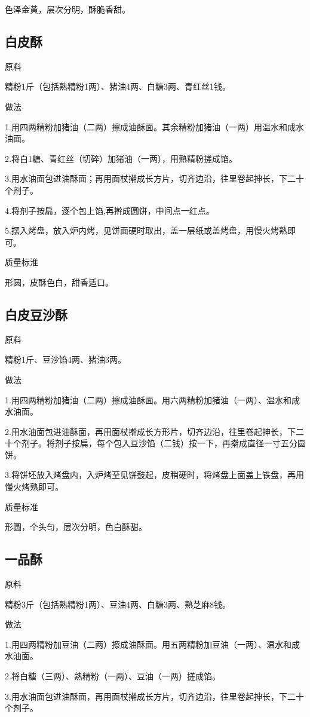 \documentclass{ctexbook}
\begin{document}
色泽金黄，层次分明，酥脆香甜。
\subsection{白皮酥}
原料

精粉1斤（包括熟精粉1两）、猪油4两、白糖3两、青红丝1钱。

做法

1.用四两精粉加猪油（二两）擦成油酥面。其余精粉加猪油（一两）用温水和成水油面。

2.将白1糖、青红丝（切碎）加猪油（一两），用熟精粉搓成馅。

3.用水油面包进油酥面；再用面杖擀成长方片，切齐边沿，往里卷起抻长，下二十个剂子。

4.将剂子按扁，逐个包上馅,再擀成圆饼，中间点一红点。

5.摆入烤盘，放入炉内烤，见饼面硬时取出，盖一层纸或盖烤盘，用慢火烤熟即可。

质量标淮

形圆，皮酥色白，甜香适口。
\subsection{白皮豆沙酥}
原料

精粉1斤、豆沙馅4两、猪油3两。

做法

1.用四两精粉加猪油（二两）擦成油酥面。用六两精粉加猪油（一两）、温水和成水油面。

2.用水油面包进油酥面，再用面杖擀成长方形片，切齐边沿，往里卷起抻长，下二十个剂子。将剂子按扁，每个包入豆沙馅（二钱）按一下，再擀成直径一寸五分圆饼。

3.将饼坯放入烤盘内，入炉烤至见饼鼓起，皮稍硬时，将烤盘上面盖上铁盘，再用慢火烤熟即可。

质量标准

形圆，个头匀，层次分明，色白酥甜。
\subsection{一品酥}
原料

精粉3斤（包括熟精粉1两）、豆油4两、白糖3两、熟芝麻8钱。

做法

1.用四两精粉加豆油（二两）擦成油酥面。用五两精粉加豆油（一两）、温水和成水油面。

2.将白糖（三两）、熟精粉（一两）、豆油（一两）搓成馅。

3.用水油面包进油酥面，再用面杖擀成长方片，切齐边沿，往里卷起抻长，下二十个剂子。
\end{document}
